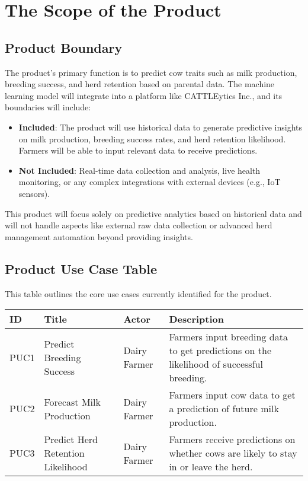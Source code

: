 \documentclass[12pt]{article}
\begin{document}
\section{The Scope of the Product}


\subsection{Product Boundary}
The product's primary function is to predict cow traits such as milk production,
breeding success, and herd retention based on parental data. The machine 
learning model will integrate into a platform like CATTLEytics Inc., and its 
boundaries will include:

\begin{itemize}
    \item \textbf{Included}: The product will use historical data to generate 
    predictive insights on milk production, breeding success rates, and herd 
    retention likelihood. Farmers will be able to input relevant data to 
    receive predictions.
    \item \textbf{Not Included}: Real-time data collection and analysis, 
    live health monitoring, or any complex integrations with external devices 
    (e.g., IoT sensors).
\end{itemize}

This product will focus solely on predictive analytics based on historical data 
and will not handle aspects like external raw data collection or advanced herd 
management automation beyond providing insights.

\subsection{Product Use Case Table}
This table outlines the core use cases currently identified for the product.

\begin{table}[h!]
\centering
\begin{tabularx}{\textwidth}{|p{2cm}|p{3cm}|p{3cm}|X|}
    \hline
    \textbf{ID} & \textbf{Title} & \textbf{Actor} & \textbf{Description} \\
    \hline
    PUC1 & Predict Breeding Success & Dairy Farmer & Farmers input breeding 
    data to get predictions on the likelihood of successful breeding. \\
    \hline
    PUC2 & Forecast Milk Production & Dairy Farmer & Farmers input cow data 
    to get a prediction of future milk production. \\
    \hline
    PUC3 & Predict Herd Retention Likelihood & Dairy Farmer & Farmers receive 
    predictions on whether cows are likely to stay in or leave the herd. \\
    \hline
\end{tabularx}
\end{table}
\end{document}
